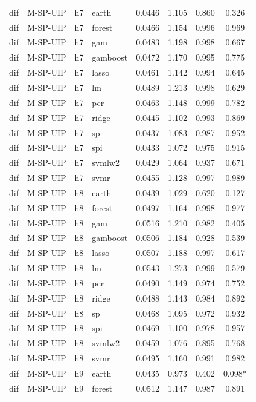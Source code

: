 \begin{ThreePartTable}
\begin{longtable}[t]{llclcccc}
dif & M-SP-UIP & h7 & earth & 0.0446 & 1.105 & 0.860 & 0.326\\
dif & M-SP-UIP & h7 & forest & 0.0466 & 1.154 & 0.996 & 0.969\\
dif & M-SP-UIP & h7 & gam & 0.0483 & 1.198 & 0.998 & 0.667\\
dif & M-SP-UIP & h7 & gamboost & 0.0472 & 1.170 & 0.995 & 0.775\\
dif & M-SP-UIP & h7 & lasso & 0.0461 & 1.142 & 0.994 & 0.645\\
dif & M-SP-UIP & h7 & lm & 0.0489 & 1.213 & 0.998 & 0.629\\
dif & M-SP-UIP & h7 & pcr & 0.0463 & 1.148 & 0.999 & 0.782\\
dif & M-SP-UIP & h7 & ridge & 0.0445 & 1.102 & 0.993 & 0.869\\
dif & M-SP-UIP & h7 & sp & 0.0437 & 1.083 & 0.987 & 0.952\\
dif & M-SP-UIP & h7 & spi & 0.0433 & 1.072 & 0.975 & 0.915\\
dif & M-SP-UIP & h7 & svmlw2 & 0.0429 & 1.064 & 0.937 & 0.671\\
dif & M-SP-UIP & h7 & svmr & 0.0455 & 1.128 & 0.997 & 0.989\\
\addlinespace
dif & M-SP-UIP & h8 & earth & 0.0439 & 1.029 & 0.620 & 0.127\\
dif & M-SP-UIP & h8 & forest & 0.0497 & 1.164 & 0.998 & 0.977\\
dif & M-SP-UIP & h8 & gam & 0.0516 & 1.210 & 0.982 & 0.405\\
dif & M-SP-UIP & h8 & gamboost & 0.0506 & 1.184 & 0.928 & 0.539\\
dif & M-SP-UIP & h8 & lasso & 0.0507 & 1.188 & 0.997 & 0.617\\
dif & M-SP-UIP & h8 & lm & 0.0543 & 1.273 & 0.999 & 0.579\\
dif & M-SP-UIP & h8 & pcr & 0.0490 & 1.149 & 0.974 & 0.752\\
dif & M-SP-UIP & h8 & ridge & 0.0488 & 1.143 & 0.984 & 0.892\\
dif & M-SP-UIP & h8 & sp & 0.0468 & 1.095 & 0.972 & 0.932\\
dif & M-SP-UIP & h8 & spi & 0.0469 & 1.100 & 0.978 & 0.957\\
dif & M-SP-UIP & h8 & svmlw2 & 0.0459 & 1.076 & 0.895 & 0.768\\
dif & M-SP-UIP & h8 & svmr & 0.0495 & 1.160 & 0.991 & 0.982\\
\addlinespace
dif & M-SP-UIP & h9 & earth & 0.0435 & 0.973 & 0.402 & 0.098*\\
dif & M-SP-UIP & h9 & forest & 0.0512 & 1.147 & 0.987 & 0.891\\

\end{longtable}
\end{ThreePartTable}
